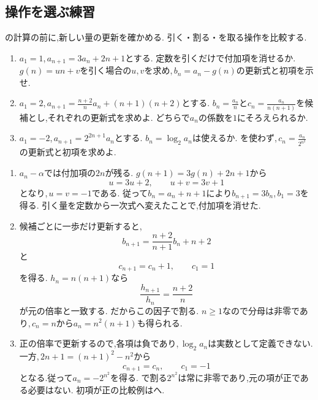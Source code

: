 \subsection{操作を選ぶ練習}\label{節：操作を選ぶ練習}
  の計算の前に,新しい量の更新を確かめる.
  引く・割る・を取る操作を比較する.

  \noindent{}\par\nobreak
  \begin{enumerate}[format=\bookitemlink{operation-choice}{problem}{answer}]
    \item $a_1=1$,\,$a_{n+1}=3a_n+2n+1$とする.
          定数を引くだけで付加項を消せるか.
          $g(n)=un+v$を引く場合の$u,v$を求め,\,$b_n=a_n-g(n)$の更新式と初項を示せ.
    \item $a_1=2$,\,$a_{n+1}=\frac{n+2}{n}a_n+(n+1)(n+2)$とする.
          $b_n=\frac{a_n}{n}$と$c_n=\frac{a_n}{n(n+1)}$を候補とし,それぞれの更新式を求めよ.
          どちらで$a_n$の係数を$1$にそろえられるか.
    \item $a_1=-2$,\,$a_{n+1}=2^{2n+1}a_n$とする.
          $b_n=\log_2a_n$は使えるか.
          を使わず,\,$c_n=\frac{a_n}{2^{n^2}}$の更新式と初項を求めよ.
  \end{enumerate}

  \noindent{}\par\nobreak
  \begin{enumerate}[format=\bookitemlink{operation-choice}{answer}{problem}]
    \item $a_n-\alpha$では付加項の$2n$が残る.
          $g(n+1)=3g(n)+2n+1$から
          \[
            u=3u+2,\qquad u+v=3v+1
          \]
          となり,\,$u=v=-1$である.
          従って$b_n=a_n+n+1$により$b_{n+1}=3b_n$,\,$b_1=3$を得る.
          引く量を定数から一次式へ変えたことで,付加項を消せた.

    \item 候補ごとに一歩だけ更新すると,
          \[
            b_{n+1}=\frac{n+2}{n+1}b_n+n+2
          \]
          と
          \[
            c_{n+1}=c_n+1,\qquad c_1=1
          \]
          を得る.
          $h_n=n(n+1)$なら
          \[
            \frac{h_{n+1}}{h_n}=\frac{n+2}{n}
          \]
          が元の倍率と一致する.
          だからこの因子で割る.
          $n\ge1$なので分母は非零であり,\,$c_n=n$から$a_n=n^2(n+1)$も得られる.

    \item 正の倍率で更新するので,各項は負であり,\,$\log_2a_n$は実数として定義できない.
          一方,\,$2n+1=(n+1)^2-n^2$から
          \[
            c_{n+1}=c_n,\qquad c_1=-1
          \]
          となる.従って$a_n=-2^{n^2}$を得る.
          で割る$2^{n^2}$は常に非零であり,元の項が正である必要はない.
          初項が正の比較例はへ.
  \end{enumerate}


